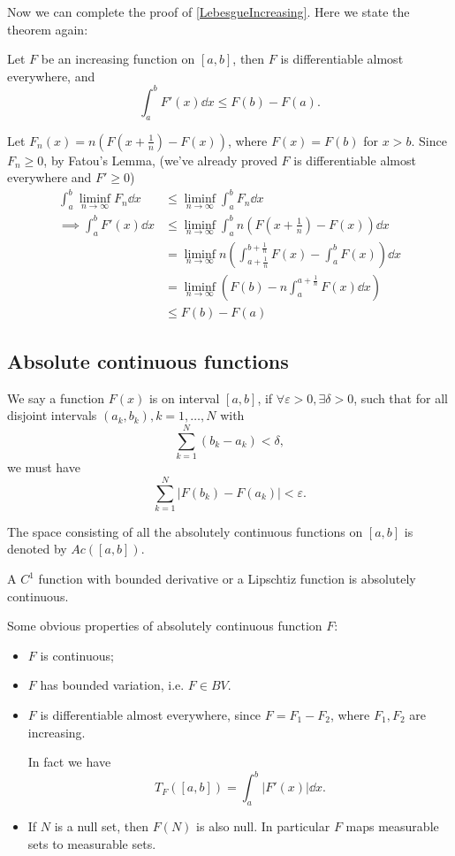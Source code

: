 Now we can complete the proof of \autoref{LebesgueIncreasing}.
Here we state the theorem again:

Let $F$ be an increasing function on $[a,b]$, then $F$ is
differentiable almost everywhere, and
\[
\int_{a}^{b} F'(x)\dd x \le F(b) - F(a).
\]

Let $F_n(x) = n(F(x+\frac{1}{n}) - F(x))$,
where $F(x) = F(b)$ for $x>b$.
Since $F_n\ge 0$, by Fatou's Lemma,
(we've already proved $F$ is differentiable almost everywhere and $F'\ge 0$)
\begin{align*}
\int_{a}^{b} \liminf_{n\to \infty} F_n \dd x
&\le \liminf_{n\to \infty} \int_{a}^{b} F_n \dd x\\
\implies \int_{a}^{b} F'(x)\dd x
&\le \liminf_{n\to \infty} \int_{a}^{b} n\left(
F\left(x+\frac{1}{n}\right) - F(x)\right)\dd x\\
&= \liminf_{n \to \infty} n\left(\int_{a+\frac{1}{n}}^{b+\frac{1}{n}} F(x)
- \int_{a}^{b} F(x)\right)\dd x\\
&= \liminf_{n\to \infty} \left(F(b) - n \int_{a}^{a+\frac{1}{n}} F(x)\dd x\right)\\
&\le F(b) - F(a)
\end{align*}

\subsection{Absolute continuous functions}
\label{sub:Absolute continuous functions}

\begin{definition}
	We say a function $F(x)$ is  on
	interval $[a,b]$, if $\forall \varepsilon>0, \exists \delta>0$,
	such that for all disjoint intervals $(a_k, b_k), k = 1,\dots,N$ with
	\[
	\sum_{k=1}^{N} (b_k - a_k) < \delta,
	\]
	we must have
	\[
	\sum_{k=1}^{N} |F(b_k) - F(a_k)| < \varepsilon.
	\]

	The space consisting of all the absolutely continuous functions on $[a,b]$
	is denoted by $Ac([a,b])$.
\end{definition}

\begin{example}
    A $C^1$ function with bounded derivative
	or a Lipschtiz function is absolutely continuous.
\end{example}

Some obvious properties of absolutely continuous function $F$:
\begin{itemize}
	\item $F$ is continuous;
	\item $F$ has bounded variation, i.e. $F\in BV$.
	\item $F$ is differentiable almost everywhere, since $F = F_1 - F_2$,
		where $F_1,F_2$ are increasing.

		In fact we have
		\[
			T_F([a,b]) = \int_{a}^{b} |F'(x)|\dd x.
		\]
	\item If $N$ is a null set, then $F(N)$ is also null.
		In particular $F$ maps measurable sets to measurable sets.
\end{itemize}

